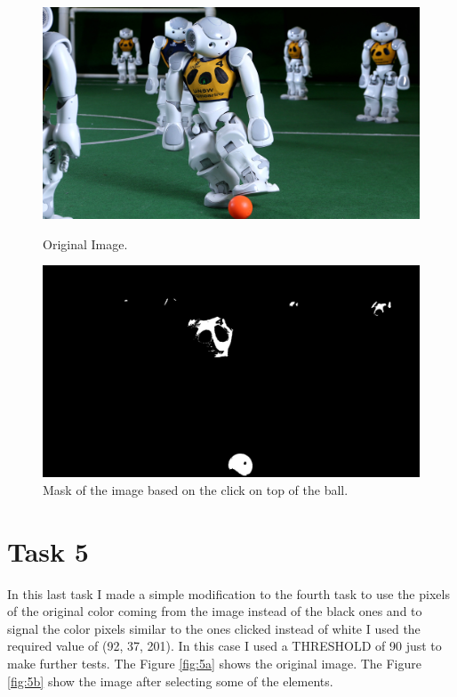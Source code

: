 \begin{figure}[h]
	\centering
	\begin{minipage}{0.45\textwidth}
		\centering
		\includegraphics[width=\linewidth]{images/source/2}
		\caption{Original Image.}
		\label{fig:4a}
        \end{minipage}
        \hspace{0.05\textwidth}
        \begin{minipage}{0.45\textwidth}
        		\centering
		\includegraphics[width=\linewidth]{images/source/task4/1}
		\caption{Mask of the image based on the click on top of the ball.}
		\label{fig:4b}
        \end{minipage}
\end{figure}


\chapter{Task 5}
In this last task I made a simple modification to the fourth task to use the pixels of the original color coming from the image instead of the black ones and to signal the color pixels similar to the ones clicked instead of white I used the required value of (92, 37, 201).
In this case I used a THRESHOLD of 90 just to make further tests.
The Figure \ref{fig:5a} shows the original image. The Figure \ref{fig:5b} show the image after selecting some of the elements.


